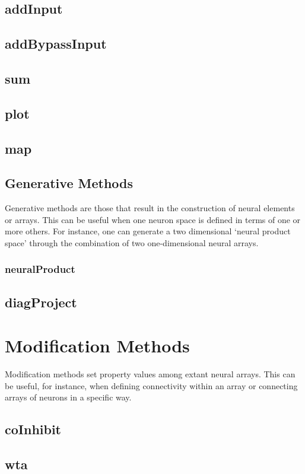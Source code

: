 \documentclass[phd, 12pt, doublespace, online]{fauthesis}
\begin{document}
\subsection{addInput}
\subsection{addBypassInput}
\subsection{sum}
\subsection{plot}
\subsection{map}


\subsection{Generative Methods}

Generative methods are those that result in the construction of neural elements or arrays. This can be useful when one neuron space is defined in terms of one or more others. For instance, one can generate a two dimensional `neural product space' through the combination of two one-dimensional neural arrays. 

\subsubsection{neuralProduct}
\subsection{diagProject}

\section{Modification Methods}

Modification methods set property values among extant neural arrays. This can be useful, for instance, when defining connectivity within an array or connecting arrays of neurons in a specific way. 

\subsection{coInhibit}
\subsection{wta}
\end{document}
